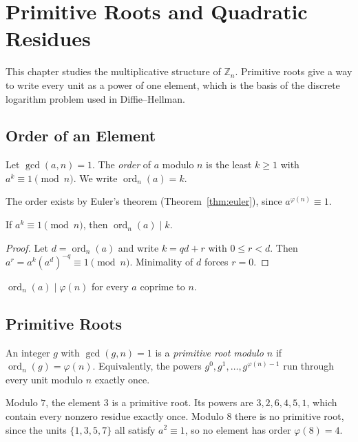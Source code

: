 \chapter{Primitive Roots and Quadratic Residues}\label{ch:primroots}

This chapter studies the multiplicative structure of $\mathbb{Z}_n$. Primitive roots give a way to write every unit as a power of one element, which is the basis of the discrete logarithm problem used in Diffie--Hellman.

\section{Order of an Element}

\begin{definition}
Let $\gcd(a,n)=1$. The \emph{order} of $a$ modulo $n$ is the least $k\ge 1$ with $a^k\equiv 1\pmod n$. We write $\operatorname{ord}_n(a)=k$.
\end{definition}

The order exists by Euler's theorem (Theorem~\ref{thm:euler}), since $a^{\varphi(n)}\equiv 1$.

\begin{proposition}\label{prop:order-divides}
If $a^k\equiv 1\pmod n$, then $\operatorname{ord}_n(a)\mid k$.
\end{proposition}

\begin{proof}
Let $d=\operatorname{ord}_n(a)$ and write $k=qd+r$ with $0\le r<d$. Then $a^r=a^k(a^d)^{-q}\equiv 1\pmod n$. Minimality of $d$ forces $r=0$.
\end{proof}

\begin{corollary}
$\operatorname{ord}_n(a)\mid\varphi(n)$ for every $a$ coprime to $n$.
\end{corollary}

\section{Primitive Roots}

\begin{definition}
An integer $g$ with $\gcd(g,n)=1$ is a \emph{primitive root modulo $n$} if $\operatorname{ord}_n(g)=\varphi(n)$. Equivalently, the powers $g^0,g^1,\dots,g^{\varphi(n)-1}$ run through every unit modulo $n$ exactly once.
\end{definition}

\begin{example}
Modulo $7$, the element $3$ is a primitive root. Its powers are $3,2,6,4,5,1$, which contain every nonzero residue exactly once. Modulo $8$ there is no primitive root, since the units $\{1,3,5,7\}$ all satisfy $a^2\equiv 1$, so no element has order $\varphi(8)=4$.
\end{example}

